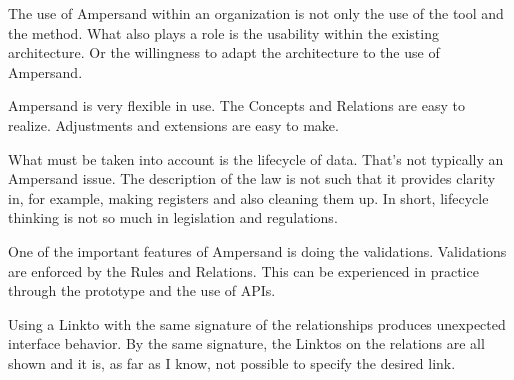 The use of Ampersand within an organization is not only the use of the tool and the method.
What also plays a role is the usability within the existing architecture.
Or the willingness to adapt the architecture to the use of Ampersand.

Ampersand is very flexible in use.
The Concepts and Relations are easy to realize.
Adjustments and extensions are easy to make.

What must be taken into account is the lifecycle of data.
That's not typically an Ampersand issue.
The description of the law is not such that it provides clarity in, for example, making registers and also cleaning them up.
In short, lifecycle thinking is not so much in legislation and regulations.

One of the important features of Ampersand is doing the validations.
Validations are enforced by the Rules and Relations.
This can be experienced in practice through the prototype and the use of APIs.

Using a Linkto with the same signature of the relationships produces unexpected interface behavior.
By the same signature, the Linktos on the relations are all shown and it is, as far as I know, not possible to specify the desired link.

\newpage





